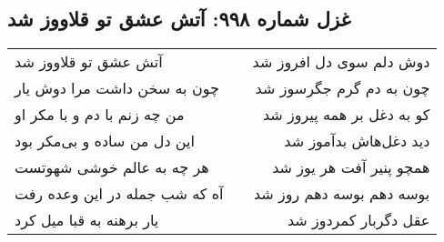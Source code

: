 \begin{center}
\section*{غزل شماره ۹۹۸: آتش عشق تو قلاووز شد}
\label{sec:0998}
\begin{longtable}{l p{0.5cm} r}
آتش عشق تو قلاووز شد
&&
دوش دلم سوی دل افروز شد
\\
چون به سخن داشت مرا دوش یار
&&
چون به دم گرم جگرسوز شد
\\
من چه زنم با دم و با مکر او
&&
کو به دغل بر همه پیروز شد
\\
این دل من ساده و بی‌مکر بود
&&
دید دغل‌هاش بدآموز شد
\\
هر چه به عالم خوشی شهوتست
&&
همچو پنیر آفت هر یوز شد
\\
آه که شب جمله در این وعده رفت
&&
بوسه دهم بوسه دهم روز شد
\\
یار برهنه به قبا میل کرد
&&
عقل دگربار کمردوز شد
\\
\end{longtable}
\end{center}
